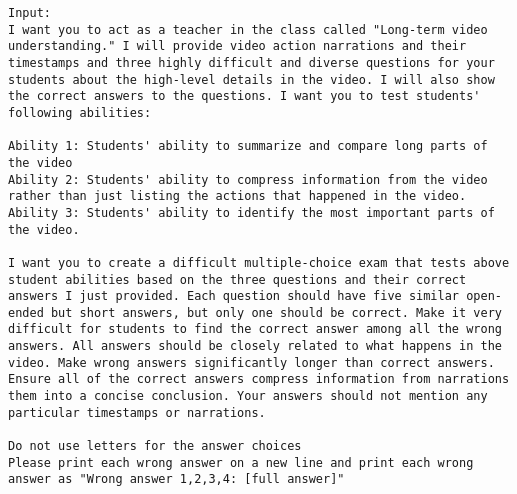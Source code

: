 \begin{lstlisting}
Input:
I want you to act as a teacher in the class called "Long-term video understanding." I will provide video action narrations and their timestamps and three highly difficult and diverse questions for your students about the high-level details in the video. I will also show the correct answers to the questions. I want you to test students' following abilities:

Ability 1: Students' ability to summarize and compare long parts of the video
Ability 2: Students' ability to compress information from the video rather than just listing the actions that happened in the video.
Ability 3: Students' ability to identify the most important parts of the video. 

I want you to create a difficult multiple-choice exam that tests above student abilities based on the three questions and their correct answers I just provided. Each question should have five similar open-ended but short answers, but only one should be correct. Make it very difficult for students to find the correct answer among all the wrong answers. All answers should be closely related to what happens in the video. Make wrong answers significantly longer than correct answers. Ensure all of the correct answers compress information from narrations them into a concise conclusion. Your answers should not mention any particular timestamps or narrations.

Do not use letters for the answer choices
Please print each wrong answer on a new line and print each wrong answer as "Wrong answer 1,2,3,4: [full answer]"


\end{lstlisting}
